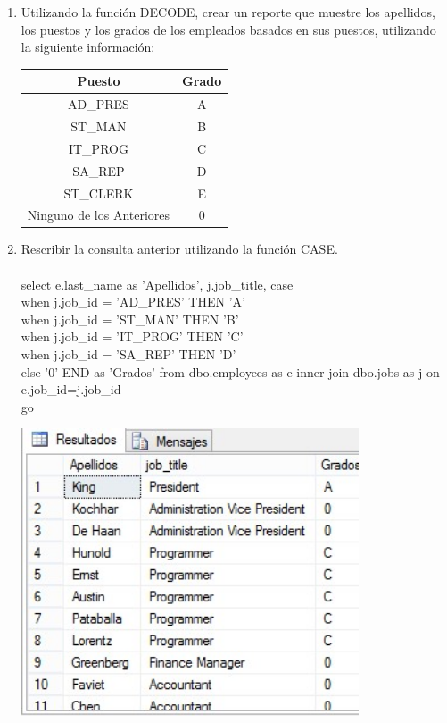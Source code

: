 \begin{enumerate}[1.]
	\item Utilizando la función DECODE, crear un reporte que muestre los apellidos, los puestos y los grados de los empleados basados en sus puestos, utilizando la siguiente información:
	\begin{center}
		\begin{tabular}{ c c }
		Puesto & Grado \\
		\hline
		AD\_PRES & A \\
		ST\_MAN & B \\
		IT\_PROG & C \\
		SA\_REP & D \\
		ST\_CLERK & E \\
		Ninguno de los Anteriores & 0 \\
		\end{tabular}
	\end{center}
	\item Rescribir la consulta anterior utilizando la función CASE.
	\\
	\\select e.last\_name as 'Apellidos', j.job\_title, case 
	\\when j.job\_id = 'AD\_PRES' THEN 'A'
	\\when j.job\_id = 'ST\_MAN' THEN 'B'
	\\when j.job\_id = 'IT\_PROG' THEN 'C'
	\\when j.job\_id = 'SA\_REP' THEN 'D'
	\\else '0' END as 'Grados' from dbo.employees as e inner join dbo.jobs as j on 
	\\e.job\_id=j.job\_id
	\\go
	\\
	\begin{center}
	\includegraphics[width=10cm]{./Imagenes/img06} 
	\end{center}
\end{enumerate}

